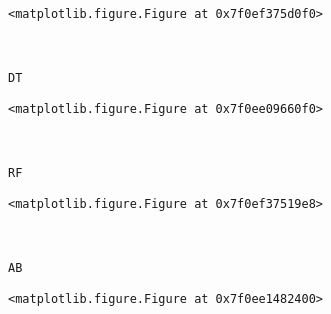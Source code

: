 \documentclass[11pt]{article}
\begin{document}
    
    \begin{verbatim}
<matplotlib.figure.Figure at 0x7f0ef375d0f0>
    \end{verbatim}

    
    \begin{center}
    \end{center}
    { \hspace*{\fill} \\}
    
    \begin{Verbatim}[commandchars=\\\{\}]
DT

    \end{Verbatim}

    
    \begin{verbatim}
<matplotlib.figure.Figure at 0x7f0ee09660f0>
    \end{verbatim}

    
    \begin{center}
    \end{center}
    { \hspace*{\fill} \\}
    
    \begin{Verbatim}[commandchars=\\\{\}]
RF

    \end{Verbatim}

    
    \begin{verbatim}
<matplotlib.figure.Figure at 0x7f0ef37519e8>
    \end{verbatim}

    
    \begin{center}
    \end{center}
    { \hspace*{\fill} \\}
    
    \begin{Verbatim}[commandchars=\\\{\}]
AB

    \end{Verbatim}

    
    \begin{verbatim}
<matplotlib.figure.Figure at 0x7f0ee1482400>
    \end{verbatim}
\end{document}
